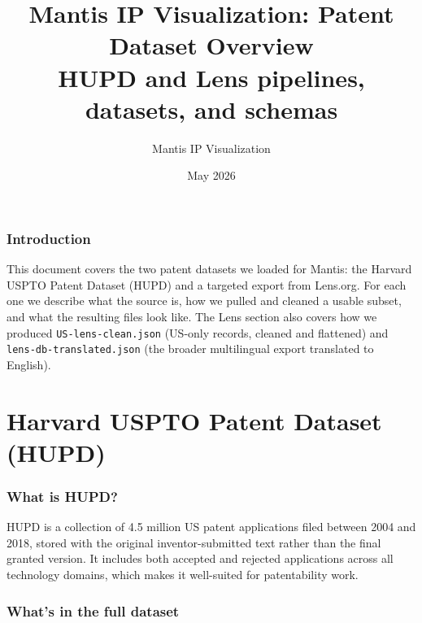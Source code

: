 \documentclass[11pt]{article}
\title{Mantis IP Visualization: Patent Dataset Overview\\
\large HUPD and Lens pipelines, datasets, and schemas}
\author{Mantis IP Visualization}
\date{May 2026}
\begin{document}
\maketitle
\tableofcontents
\newpage

\section{Introduction}

This document covers the two patent datasets we loaded for Mantis: the Harvard USPTO
Patent Dataset (HUPD) and a targeted export from Lens.org. For each one we describe
what the source is, how we pulled and cleaned a usable subset, and what the resulting
files look like. The Lens section also covers how we produced \texttt{US-lens-clean.json}
(US-only records, cleaned and flattened) and \texttt{lens-db-translated.json} (the
broader multilingual export translated to English).

\part{Harvard USPTO Patent Dataset (HUPD)}

\section{What is HUPD?}

HUPD is a collection of 4.5 million US patent applications filed between 2004 and 2018,
stored with the original inventor-submitted text rather than the final granted version.
It includes both accepted and rejected applications across all technology domains, which
makes it well-suited for patentability work.

\section{What's in the full dataset}
\end{document}
